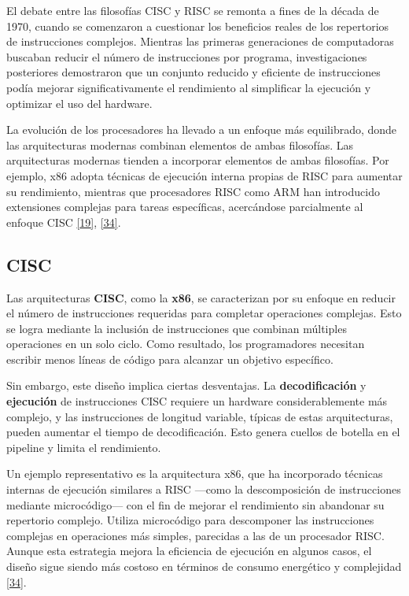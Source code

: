 \documentclass[12pt,oneside]{templates/unerthesis}
\begin{document}
El debate entre las filosofías CISC y RISC se remonta a fines de la década de 1970, cuando se comenzaron a cuestionar los beneficios reales de los repertorios de instrucciones complejos. Mientras las primeras generaciones de computadoras buscaban reducir el número de instrucciones por programa, investigaciones posteriores demostraron que un conjunto reducido y eficiente de instrucciones podía mejorar significativamente el rendimiento al simplificar la ejecución y optimizar el uso del hardware.

La evolución de los procesadores ha llevado a un enfoque más equilibrado, donde las arquitecturas modernas combinan elementos de ambas filosofías. Las arquitecturas modernas tienden a incorporar elementos de ambas filosofías. Por ejemplo, x86 adopta técnicas de ejecución interna propias de RISC para aumentar su rendimiento, mientras que procesadores RISC como ARM han introducido extensiones complejas para tareas específicas, acercándose parcialmente al enfoque CISC \protect\hyperlink{ref-hennessy2017computer}{{[}19{]}}, \protect\hyperlink{ref-patterson_computer_2014}{{[}34{]}}.

\hypertarget{cisc}{%
\subsection{CISC}\label{cisc}}

Las arquitecturas \textbf{CISC}, como la \textbf{x86}, se caracterizan por su enfoque en reducir el número de instrucciones requeridas para completar operaciones complejas. Esto se logra mediante la inclusión de instrucciones que combinan múltiples operaciones en un solo ciclo. Como resultado, los programadores necesitan escribir menos líneas de código para alcanzar un objetivo específico.

Sin embargo, este diseño implica ciertas desventajas. La \textbf{decodificación} y \textbf{ejecución} de instrucciones CISC requiere un hardware considerablemente más complejo, y las instrucciones de longitud variable, típicas de estas arquitecturas, pueden aumentar el tiempo de decodificación. Esto genera cuellos de botella en el pipeline y limita el rendimiento.

Un ejemplo representativo es la arquitectura x86, que ha incorporado técnicas internas de ejecución similares a RISC ---como la descomposición de instrucciones mediante microcódigo--- con el fin de mejorar el rendimiento sin abandonar su repertorio complejo. Utiliza microcódigo para descomponer las instrucciones complejas en operaciones más simples, parecidas a las de un procesador RISC. Aunque esta estrategia mejora la eficiencia de ejecución en algunos casos, el diseño sigue siendo más costoso en términos de consumo energético y complejidad \protect\hyperlink{ref-patterson_computer_2014}{{[}34{]}}.
\end{document}

